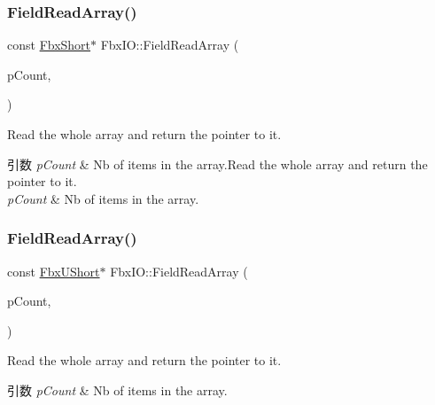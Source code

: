 \subsubsection{\texorpdfstring{Field\+Read\+Array()}{FieldReadArray()}\hspace{0.1cm}{\footnotesize\ttfamily [2/11]}}
{\footnotesize\ttfamily const \hyperlink{fbxtypes_8h_a56e7a4f56baf132527df7c3cd07017b7}{Fbx\+Short}$\ast$ Fbx\+I\+O\+::\+Field\+Read\+Array (\begin{DoxyParamCaption}\item[{int \&}]{p\+Count,  }\item[{const \hyperlink{fbxtypes_8h_a56e7a4f56baf132527df7c3cd07017b7}{Fbx\+Short} $\ast$}]{ }\end{DoxyParamCaption})}

Read the whole array and return the pointer to it. 
\begin{DoxyParams}{引数}
{\em p\+Count} & Nb of items in the array.\+Read the whole array and return the pointer to it. \\
\hline
{\em p\+Count} & Nb of items in the array. \\
\hline
\end{DoxyParams}
\mbox{\label{class_fbx_i_o_a98c8d9a4895af33ef93b508e93d787f3}} 
\subsubsection{\texorpdfstring{Field\+Read\+Array()}{FieldReadArray()}\hspace{0.1cm}{\footnotesize\ttfamily [3/11]}}
{\footnotesize\ttfamily const \hyperlink{fbxtypes_8h_a321ef060885fc068fd77ac69a49f51d9}{Fbx\+U\+Short}$\ast$ Fbx\+I\+O\+::\+Field\+Read\+Array (\begin{DoxyParamCaption}\item[{int \&}]{p\+Count,  }\item[{const \hyperlink{fbxtypes_8h_a321ef060885fc068fd77ac69a49f51d9}{Fbx\+U\+Short} $\ast$}]{ }\end{DoxyParamCaption})}

Read the whole array and return the pointer to it. 
\begin{DoxyParams}{引数}
{\em p\+Count} & Nb of items in the array. \\
\hline
\end{DoxyParams}
\mbox{\label{class_fbx_i_o_ae6f494d986e3550a15c2fe9b28a960a2}} 
